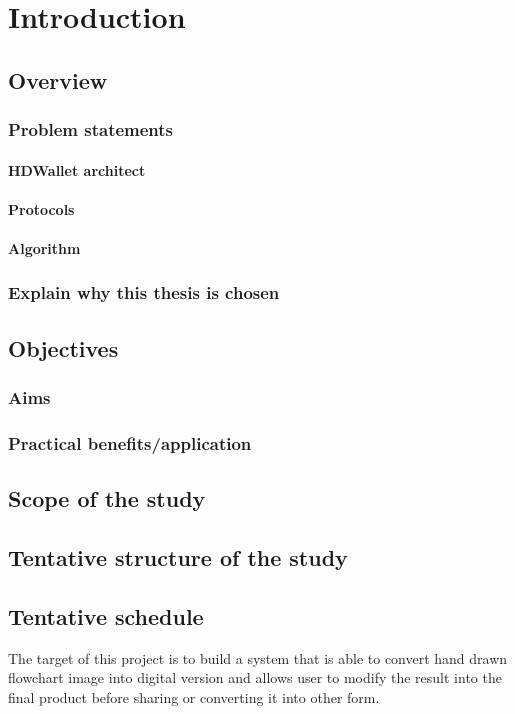 \chapter{Introduction} \label{introduction}
\section{Overview}
\subsection{Problem statements}

\subsubsection{HDWallet architect}

\subsubsection{Protocols}

\subsubsection{Algorithm}

\subsection{Explain why this thesis is chosen}

\section{Objectives}

\subsection{Aims}

\subsection{Practical benefits/application}

\section{Scope of the study}

\section{Tentative structure of the study}

\section{Tentative schedule}


The target of this project is to build a system that is able to convert hand drawn flowchart image into digital version and allows user to modify the result into the final product before sharing or converting it into other form.
